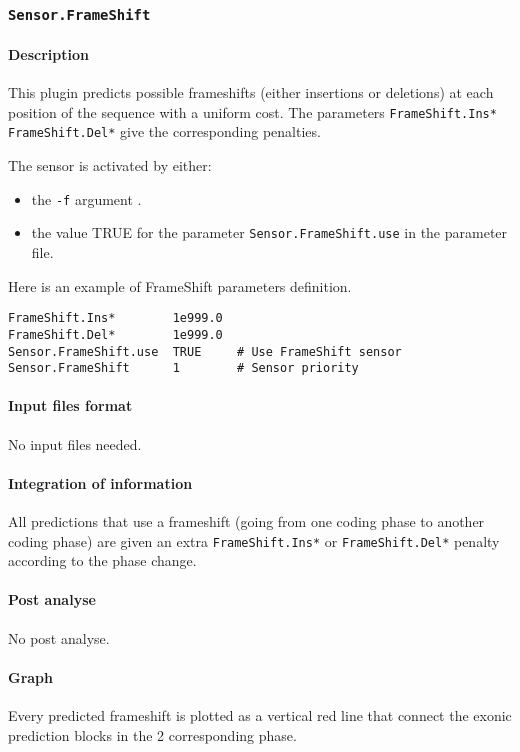 
\subsubsection{\texttt{Sensor.FrameShift}}

\paragraph{Description}

This plugin predicts possible frameshifts (either insertions or
deletions) at each position of the sequence with a uniform cost. The
parameters \texttt{FrameShift.Ins*} \texttt{FrameShift.Del*} give the
corresponding penalties.

The sensor is activated by either:
\begin{itemize}
\item the \texttt{-f} argument .
\item the value TRUE for the parameter \texttt{Sensor.FrameShift.use} in
  the parameter file.
\end{itemize}

Here is an example of FrameShift parameters definition.
\begin{Verbatim}[fontsize=\small]
FrameShift.Ins*        1e999.0
FrameShift.Del*        1e999.0
Sensor.FrameShift.use  TRUE     # Use FrameShift sensor
Sensor.FrameShift      1        # Sensor priority
\end{Verbatim}

\paragraph{Input files format}

No input files  needed.

\paragraph{Integration of information}

All predictions that use a frameshift (going from one coding phase to
another coding phase) are given an extra \texttt{FrameShift.Ins*} or
\texttt{FrameShift.Del*} penalty according to the phase change.

\paragraph{Post analyse}

No post analyse.

\paragraph{Graph}

Every predicted frameshift is plotted as a vertical red line that
connect the exonic prediction blocks in the 2 corresponding phase.


